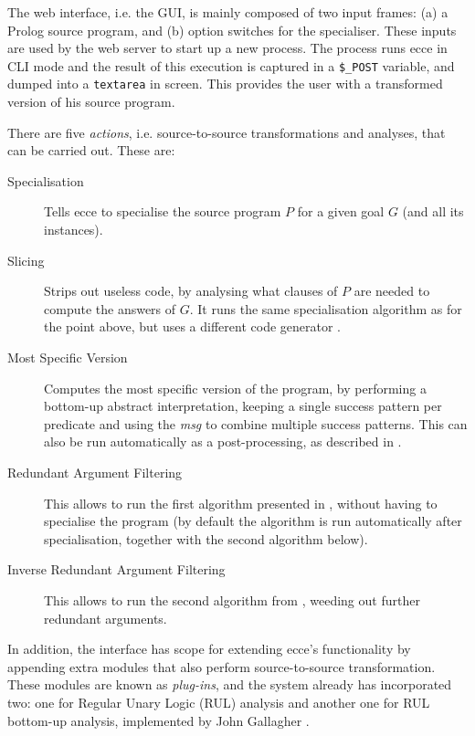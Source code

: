 \documentclass{sig-alternate}
\begin{document}
The web interface, i.e. the GUI, is mainly composed of two input frames: (a) a Prolog source program, and (b) option switches for the specialiser. These inputs are used by the web server to start up a new process. The process runs {\sc ecce} in CLI mode and the result of this execution is captured in a \verb!$_POST! variable, and dumped into a \verb!textarea! in screen. This provides the user with a transformed version of his source program.

There are five {\em actions}, i.e. source-to-source transformations and analyses, that can be carried out. These are:

\begin{description}
\item[Specialisation] Tells {\sc ecce} to specialise the source program $P$ for a given goal $G$ (and all its instances).
\item[Slicing] Strips out useless code, by analysing what clauses of $P$ are needed to compute the answers of $G$.
It runs the same specialisation algorithm as for the point above, but uses a different code generator
 \cite{LeuschelVidal:ESOP05}.
\item[Most Specific Version] Computes the most specific version \cite{MarriottNaishLassez:AMAI90} of the program,
 by performing a bottom-up abstract interpretation, keeping a single success pattern per predicate and using
 the {\em msg} to combine multiple success patterns.
 This can also be run automatically as a post-processing, as described in \cite{LeuschelDeSchreye:PLILP96}.
\item[Redundant Argument Filtering] This allows to run the first algorithm presented in \cite{LeuschelSorensen:RAF},
 without having to specialise the program (by default the algorithm is run automatically after specialisation, together with
 the second algorithm below).
\item[Inverse Redundant Argument Filtering] This allows to run the second algorithm from \cite{LeuschelSorensen:RAF},
 weeding out further redundant arguments.
\end{description}

In addition, the interface has scope for extending {\sc ecce}'s functionality by appending extra modules that also perform source-to-source transformation. These modules are known as {\em plug-ins}, and the system already has incorporated two: one for Regular Unary Logic (RUL) analysis and another one for RUL bottom-up analysis, implemented by John Gallagher \cite{GallagherdeWaal:ICLP94}.
\end{document}
